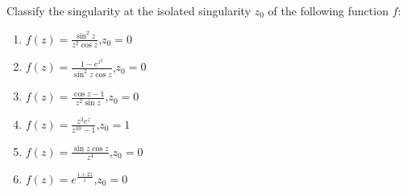 \documentclass{article}
\theoremstyle{definition}
\begin{document}
\begin{tcolorbox}[colback=white,colframe=white,arc=5pt,title={\color{black}\bf $\bullet$ Classification of Singularities I}]
	Classify the singularity at the isolated singularity $z_0$ of the following function $f$:
	\begin{enumerate}[(1)]
		\item $\displaystyle f(z)=\frac{\sin^2z}{z^2\cos z}$,\quad $z_0=0$
		\item $\displaystyle f(z)=\frac{1-e^{z^2}}{\sin^2z\cos z}$,\quad $z_0=0$
		\item $\displaystyle f(z)=\frac{\cos z-1}{z^2\sin z}$,\quad $z_0=0$
		\item $\displaystyle f(z)=\frac{z^3e^z}{z^{10}-1}$,\quad $z_0=1$
		\item $\displaystyle f(z)=\frac{\sin z\cos z}{z^4}$,\quad $z_0=0$
		\item $\displaystyle f(z)=e^{\displaystyle\frac{1+2z}{z}}$,\quad $z_0=0$
	\end{enumerate}
\end{tcolorbox}
\end{document}
